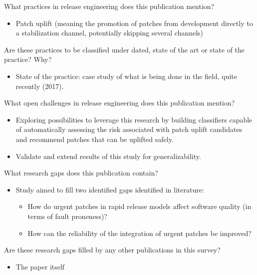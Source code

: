 \documentclass[]{book}
\providecommand{\tightlist}{%
  \setlength{\itemsep}{0pt}\setlength{\parskip}{0pt}}
\begin{document}
What practices in release engineering does this publication mention?

\begin{itemize}
\tightlist
\item
  Patch uplift (meaning the promotion of patches from development
  directly to a stabilization channel, potentially skipping several
  channels)
\end{itemize}

Are these practices to be classified under dated, state of the art or
state of the practice? Why?

\begin{itemize}
\tightlist
\item
  State of the practice: case study of what is being done in the field,
  quite recently (2017).
\end{itemize}

What open challenges in release engineering does this publication
mention?

\begin{itemize}
\tightlist
\item
  Exploring possibilities to leverage this research by building
  classifiers capable of automatically assessing the risk associated
  with patch uplift candidates and recommend patches that can be
  uplifted safely.
\item
  Validate and extend results of this study for generalizability.
\end{itemize}

What research gaps does this publication contain?

\begin{itemize}
\tightlist
\item
  Study aimed to fill two identified gaps identified in literature:

  \begin{itemize}
  \tightlist
  \item
    How do urgent patches in rapid release models affect software
    quality (in terms of fault proneness)?
  \item
    How can the reliability of the integration of urgent patches be
    improved?
  \end{itemize}
\end{itemize}

Are these research gaps filled by any other publications in this survey?

\begin{itemize}
\tightlist
\item
  The paper itself
\end{itemize}
\end{document}

